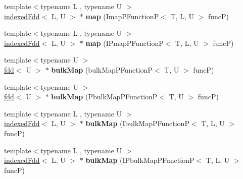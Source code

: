 \begin{DoxyCompactItemize}
\item 
\hypertarget{classfaster_1_1fdd_3_01T_01_5_01_4_a56cd3496f7b7e836af3df5a511d2b3d7}{}{\footnotesize template$<$typename L , typename U $>$ }\\\hyperlink{classfaster_1_1indexedFdd}{indexed\+Fdd}$<$ L, U $>$ $\ast$ {\bfseries map} (Imap\+P\+Function\+P$<$ T, L, U $>$ func\+P)\label{classfaster_1_1fdd_3_01T_01_5_01_4_a56cd3496f7b7e836af3df5a511d2b3d7}

\item 
\hypertarget{classfaster_1_1fdd_3_01T_01_5_01_4_ae2c6b56f97e260ada3f6115f7dc852ac}{}{\footnotesize template$<$typename L , typename U $>$ }\\\hyperlink{classfaster_1_1indexedFdd}{indexed\+Fdd}$<$ L, U $>$ $\ast$ {\bfseries map} (I\+Pmap\+P\+Function\+P$<$ T, L, U $>$ func\+P)\label{classfaster_1_1fdd_3_01T_01_5_01_4_ae2c6b56f97e260ada3f6115f7dc852ac}

\item 
\hypertarget{classfaster_1_1fdd_3_01T_01_5_01_4_abbf7abb6ecd34cf25150dd10cbc1ad09}{}{\footnotesize template$<$typename U $>$ }\\\hyperlink{classfaster_1_1fdd}{fdd}$<$ U $>$ $\ast$ {\bfseries bulk\+Map} (bulk\+Map\+P\+Function\+P$<$ T, U $>$ func\+P)\label{classfaster_1_1fdd_3_01T_01_5_01_4_abbf7abb6ecd34cf25150dd10cbc1ad09}

\item 
\hypertarget{classfaster_1_1fdd_3_01T_01_5_01_4_a25acd0d4b8ef01f7a60b17ff33024160}{}{\footnotesize template$<$typename U $>$ }\\\hyperlink{classfaster_1_1fdd}{fdd}$<$ U $>$ $\ast$ {\bfseries bulk\+Map} (Pbulk\+Map\+P\+Function\+P$<$ T, U $>$ func\+P)\label{classfaster_1_1fdd_3_01T_01_5_01_4_a25acd0d4b8ef01f7a60b17ff33024160}

\item 
\hypertarget{classfaster_1_1fdd_3_01T_01_5_01_4_ae4d426d09264286ae02c1aa0bf9356e2}{}{\footnotesize template$<$typename L , typename U $>$ }\\\hyperlink{classfaster_1_1indexedFdd}{indexed\+Fdd}$<$ L, U $>$ $\ast$ {\bfseries bulk\+Map} (Ibulk\+Map\+P\+Function\+P$<$ T, L, U $>$ func\+P)\label{classfaster_1_1fdd_3_01T_01_5_01_4_ae4d426d09264286ae02c1aa0bf9356e2}

\item 
\hypertarget{classfaster_1_1fdd_3_01T_01_5_01_4_ac83f6ce9ca84f55c4ad8dc2f8f0fcad7}{}{\footnotesize template$<$typename L , typename U $>$ }\\\hyperlink{classfaster_1_1indexedFdd}{indexed\+Fdd}$<$ L, U $>$ $\ast$ {\bfseries bulk\+Map} (I\+Pbulk\+Map\+P\+Function\+P$<$ T, L, U $>$ func\+P)\label{classfaster_1_1fdd_3_01T_01_5_01_4_ac83f6ce9ca84f55c4ad8dc2f8f0fcad7}


\end{DoxyCompactItemize}
